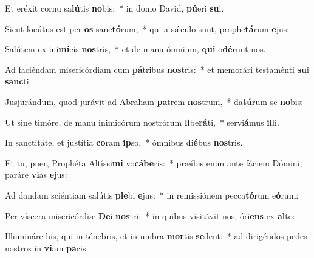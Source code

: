 \item Et eréxit cornu sa\textbf{lú}tis \textbf{no}bis:~* in domo David, \textbf{pú}eri \textbf{su}i.
\item Sicut locútus est per \textbf{os} sanc\textbf{tó}rum,~* qui a sǽculo sunt, prophe\textbf{tá}rum \textbf{e}jus:
\item Salútem ex ini\textbf{mí}cis \textbf{nos}tris,~* et de manu ómnium, \textbf{qui} o\textbf{dé}runt nos.
\item Ad faciéndam misericórdiam cum \textbf{pá}tribus \textbf{nos}tris:~* et memorári testaménti \textbf{su}i \textbf{sanc}ti.
\item Jusjurándum, quod jurávit ad Abraham \textbf{pa}trem \textbf{nos}trum,~* da\textbf{tú}rum se \textbf{no}bis:
\item Ut sine timóre, de manu inimicórum nostrórum \textbf{li}be\textbf{rá}ti,~* servi\textbf{á}mus \textbf{il}li.
\item In sanctitáte, et justítia \textbf{co}ram \textbf{ip}so,~* ómnibus di\textbf{é}bus \textbf{nos}tris.
\item Et tu, puer, Prophéta Altíssi\textbf{mi} vo\textbf{cá}\textbf{be}ris:~* præíbis enim ante fáciem Dómini, paráre \textbf{vi}as \textbf{e}jus:
\item Ad dandam sciéntiam salútis \textbf{ple}bi \textbf{e}jus:~* in remissiónem pecca\textbf{tó}rum e\textbf{ó}rum:
\item Per víscera misericórdiæ \textbf{De}i \textbf{nos}tri:~* in quibus visitávit nos, óri\textbf{ens} ex \textbf{al}to:
\item Illumináre his, qui in ténebris, et in umbra \textbf{mor}tis \textbf{se}dent:~* ad dirigéndos pedes nostros in \textbf{vi}am \textbf{pa}cis.
